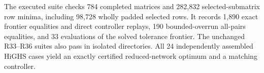 The executed suite checks 784 completed matrices and 282,832 selected-submatrix row minima, including 98,728 wholly padded selected rows. It records 1,890 exact frontier equalities and direct controller replays, 190 bounded-overrun all-pairs equalities, and 33 evaluations of the solved tolerance frontier. The unchanged R33--R36 suites also pass in isolated directories. All 24 independently assembled HiGHS cases yield an exactly certified reduced-network optimum and a matching controller.
